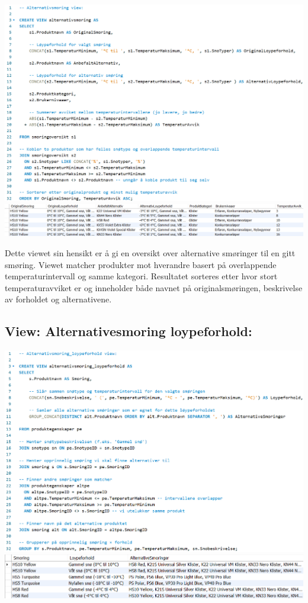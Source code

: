 \documentclass[10pt, a4paper]{article}
\begin{document}
\includegraphics[width=\textwidth]{alternativsmoring.png}
\includegraphics[width=\textwidth]{alternativsmoring_resultat.png}

Dette viewet sin hensikt er å gi en oversikt over alternative smøringer til en gitt smøring. Viewet matcher produkter mot hverandre basert på overlappende temperaturintervall og samme kategori. Resultatet sorteres etter hvor stort temperaturavviket er og inneholder både navnet på originalsmøringen, beskrivelse av forholdet og alternativene. 

\subsection{View: Alternativesmoring loypeforhold:}

\includegraphics[width=\textwidth]{alternativsmoring_loypeforhold.png}
\includegraphics[width=\textwidth]{alternativsmoring_loypeforhold_resultat.png}
\end{document}
